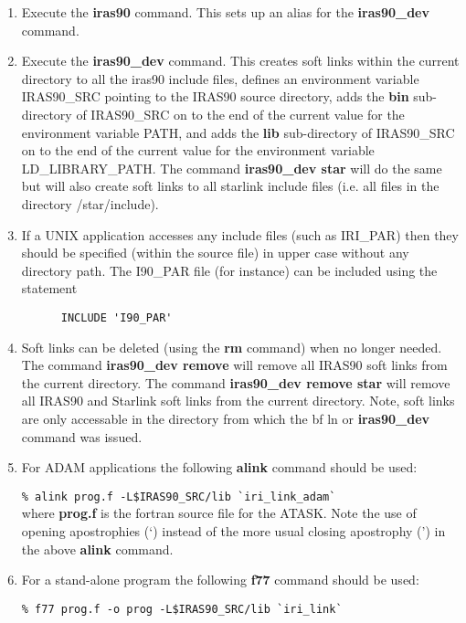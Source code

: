 \begin{enumerate}
\item Execute the {\bf iras90} command. This sets up an alias for the
{\bf iras90\_dev} command.

\item Execute the {\bf iras90\_dev} command.  This creates soft links
within the current directory to
all the iras90 include files, defines an environment variable IRAS90\_SRC
pointing to the IRAS90 source directory, adds the {\bf bin}
sub-directory of IRAS90\_SRC on to the end of the current value for the
environment variable PATH, and adds the {\bf lib} sub-directory of
IRAS90\_SRC on to the end of the current value for the environment
variable LD\_LIBRARY\_PATH. The command {\bf iras90\_dev star} will do
the same but will also create soft links to all starlink include files
(i.e. all files in the directory /star/include).

\item If a UNIX application accesses any include files (such as
IRI\_PAR) then they should be specified (within the source file) in upper case
without any directory
path. The I90\_PAR file (for instance) can be included using the statement

\verb+      INCLUDE 'I90_PAR'+\\

\item Soft links can be deleted (using the {\bf rm} command) when no longer
needed.
The command {\bf iras90\_dev remove} will remove all IRAS90 soft links from
the current directory. The command {\bf iras90\_dev remove star} will
remove all IRAS90 and Starlink soft links from the current directory.
Note, soft links are only accessable in the directory from which the {bf ln}
or {\bf iras90\_dev} command was issued.
\item For ADAM applications the following {\bf alink} command should be used:

\verb+% alink prog.f -L$IRAS90_SRC/lib `iri_link_adam`+\\

where {\bf prog.f} is the fortran source file for the ATASK.
Note the use of opening apostrophies (`) instead of the more usual closing
apostrophy (') in the above {\bf alink} command.

\item For a stand-alone program the following {\bf f77} command should be used:

\verb+% f77 prog.f -o prog -L$IRAS90_SRC/lib `iri_link`+\\
\end{enumerate}


